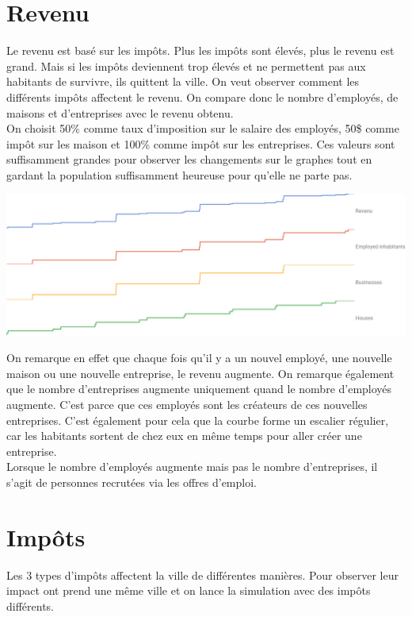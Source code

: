 \documentclass[11pt]{report}
\begin{document}
\section{Revenu}
Le revenu est basé sur les impôts. Plus les impôts sont élevés, plus le revenu est grand. Mais si les impôts deviennent trop élevés et ne permettent pas aux habitants de survivre, ils quittent la ville.
On veut observer comment les différents impôts affectent le revenu. On compare donc le nombre d'employés, de maisons et d'entreprises avec le revenu obtenu.\\
On choisit 50\% comme taux d'imposition sur le salaire des employés, 50\$ comme impôt sur les maison et 100\% comme impôt sur les entreprises. Ces valeurs sont suffisamment grandes pour observer les changements sur le graphes tout en gardant la population suffisamment heureuse pour qu'elle ne parte pas.
\begin{center}
	\includegraphics[width=\textwidth]{revenu}
\end{center}
On remarque en effet que chaque fois qu'il y a un nouvel employé, une nouvelle maison ou une nouvelle entreprise, le revenu augmente. On remarque également que le nombre d'entreprises augmente uniquement quand le nombre d'employés augmente. C'est parce que ces employés sont les créateurs de ces nouvelles entreprises. C'est également pour cela que la courbe forme un escalier régulier, car les habitants sortent de chez eux en même temps pour aller créer une entreprise.\\
Lorsque le nombre d'employés augmente mais pas le nombre d'entreprises, il s'agit de personnes recrutées via les offres d'emploi.


\newpage
\section{Impôts}
Les 3 types d'impôts affectent la ville de différentes manières. Pour observer leur impact ont prend une même ville et on lance la simulation avec des impôts différents.
\end{document}
